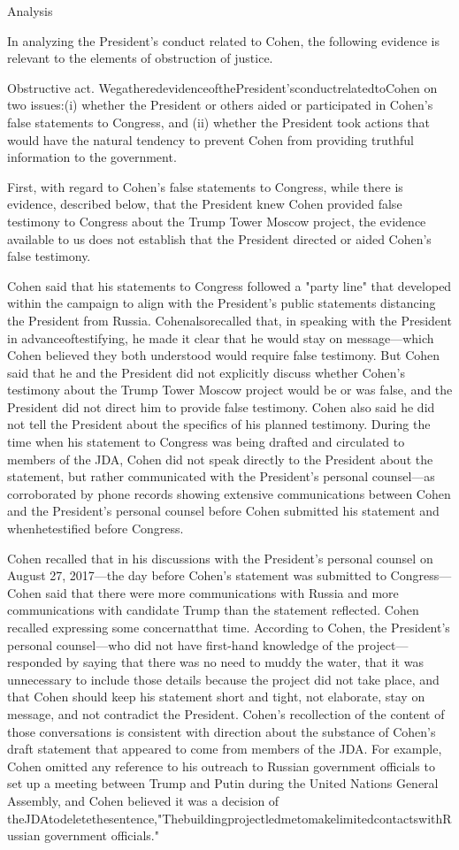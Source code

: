 {Analysis

In analyzing the President's conduct related to Cohen, the following evidence is relevant to the elements of obstruction of justice.

Obstructive act.
WegatheredevidenceofthePresident'sconductrelatedtoCohen on two issues:(i) whether the President or others aided or participated in Cohen's false statements to Congress, and (ii) whether the President took actions that would have the natural tendency to prevent Cohen from providing truthful information to the government.

First, with regard to Cohen's false statements to Congress, while there is evidence, described below, that the President knew Cohen provided false testimony to Congress about the Trump Tower Moscow project, the evidence available to us does not establish that the President directed or aided Cohen's false testimony.

Cohen said that his statements to Congress followed a "party line" that developed within the campaign to align with the President's public statements distancing the President from Russia.
Cohenalsorecalled that, in speaking with the President in advanceoftestifying, he made it clear that he would stay on message—which Cohen believed they both understood would require false testimony.
But Cohen said that he and the President did not explicitly discuss whether Cohen's testimony about the Trump Tower Moscow project would be or was false, and the President did not direct him to provide false testimony.
Cohen also said he did not tell the President about the specifics of his planned testimony.
During the time when his statement to Congress was being drafted and circulated to members of the JDA, Cohen did not speak directly to the President about the statement, but rather communicated with the President's personal counsel—as corroborated by phone records showing extensive communications between Cohen and the President's personal counsel before Cohen submitted his statement and whenhetestified before Congress.

Cohen recalled that in his discussions with the President's personal counsel on August 27, 2017—the day before Cohen's statement was submitted to Congress—Cohen said that there were more communications with Russia and more communications with candidate Trump than the statement reflected.
Cohen recalled expressing some concernatthat time.
According to Cohen, the President's personal counsel—who did not have first-hand knowledge of the project— responded by saying that there was no need to muddy the water, that it was unnecessary to include those details because the project did not take place, and that Cohen should keep his statement short and tight, not elaborate, stay on message, and not contradict the President.
Cohen's recollection of the content of those conversations is consistent with direction about the substance of Cohen's draft statement that appeared to come from members of the JDA.
For example, Cohen omitted any reference to his outreach to Russian government officials to set up a meeting between Trump and Putin during the United Nations General Assembly, and Cohen believed it was a decision of theJDAtodeletethesentence,"ThebuildingprojectledmetomakelimitedcontactswithRussian government officials."

}
